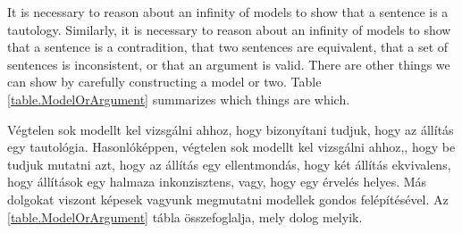 It is necessary to reason about an infinity of models to show that a sentence is a tautology. Similarly, it is necessary to reason about an infinity of models to show that a sentence is a contradition, that two sentences are equivalent, that a set of sentences is inconsistent, or that an argument is valid. There are other things we can show by carefully constructing a model or two. Table \ref{table.ModelOrArgument} summarizes which things are which.

Végtelen sok modellt kel vizsgálni ahhoz, hogy bizonyítani tudjuk, hogy az állítás egy tautológia. Hasonlóképpen, végtelen sok modellt kel vizsgálni ahhoz,, hogy be tudjuk mutatni azt, hogy az állítás egy ellentmondás, hogy két állítás ekvivalens, hogy állítások egy halmaza inkonzisztens, vagy, hogy egy érvelés helyes. Más dolgokat viszont képesek vagyunk megmutatni modellek gondos felépítésével. Az \ref{table.ModelOrArgument} tábla összefoglalja, mely dolog melyik. 


